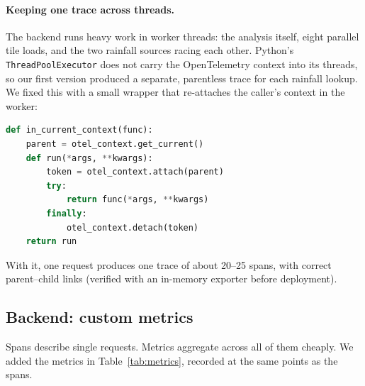 \documentclass[manuscript,screen]{acmart}
\begin{document}
\paragraph{Keeping one trace across threads.} The backend runs heavy work
in worker threads: the analysis itself, eight parallel tile loads, and the
two rainfall sources racing each other. Python's
\texttt{ThreadPoolExecutor} does not carry the OpenTelemetry context into
its threads, so our first version produced a separate, parentless trace
for each rainfall lookup. We fixed this with a small wrapper that
re-attaches the caller's context in the worker:

\begin{lstlisting}[language=Python]
def in_current_context(func):
    parent = otel_context.get_current()
    def run(*args, **kwargs):
        token = otel_context.attach(parent)
        try:
            return func(*args, **kwargs)
        finally:
            otel_context.detach(token)
    return run
\end{lstlisting}

With it, one request produces one trace of about 20--25 spans, with
correct parent--child links (verified with an in-memory exporter before
deployment).

\subsection{Backend: custom metrics}
Spans describe single requests. Metrics aggregate across all of them
cheaply. We added the metrics in Table~\ref{tab:metrics}, recorded at the
same points as the spans.
\end{document}
